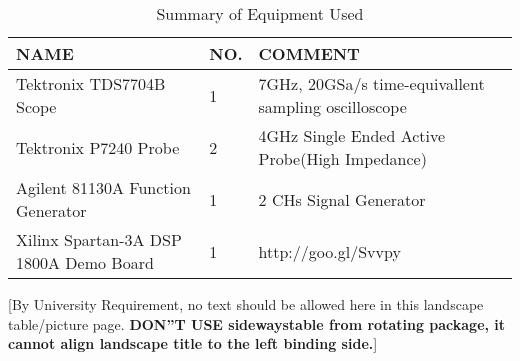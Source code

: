 \begin{landscape}

\begin{table}[!hbtp]
  \begin{center}
  \caption{Summary of Equipment Used}
  \label{tab:equpiment}%

    \begin{tabular}{|l|l|l|}
    \hline
    \textbf{NAME} 				& 	\textbf{NO.} 	& 	\textbf{COMMENT} \\	\hline
    Tektronix TDS7704B Scope 		& 	1     			& 	7GHz, 20GSa/s time-equivallent sampling oscilloscope \\	\hline
    Tektronix P7240 Probe 			& 	2     			& 	4GHz Single Ended Active Probe(High Impedance) \\	\hline
    Agilent 81130A Function Generator 	& 	1     			& 	2 CHs Signal Generator \\	\hline
    Xilinx Spartan-3A DSP 1800A Demo Board & 1     			& 	http://goo.gl/Svvpy \\	\hline
    \end{tabular}%
    
        [{\small By University Requirement, no text should be allowed here in this landscape table/picture page. \textbf{ DON''T USE sidewaystable from rotating package, it cannot align landscape title to the left binding side.}}]
        \end{center}
\end{table}

\end{landscape}
